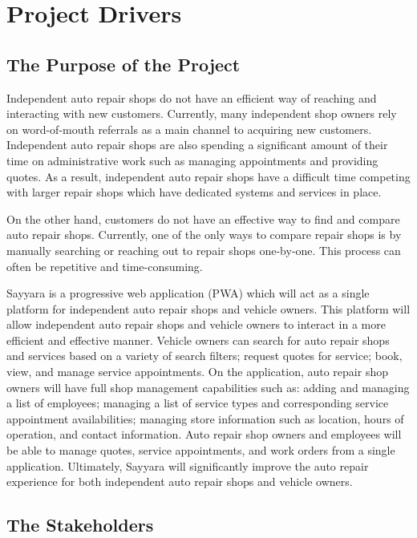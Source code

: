\documentclass[12pt]{article}
\begin{document}
\section{Project Drivers}

\subsection{The Purpose of the Project}

Independent auto repair shops do not have an efficient way of reaching and interacting with new
customers. Currently, many independent shop owners rely on word-of-mouth referrals as a main
channel to acquiring new customers. Independent auto repair shops are also spending a significant
amount of their time on administrative work such as managing appointments and providing quotes. As
a result, independent auto repair shops have a difficult time competing with larger repair shops
which have dedicated systems and services in place.

On the other hand, customers do not have an effective way to find and compare auto repair shops.
Currently, one of the only ways to compare repair shops is by manually searching or reaching out to
repair shops one-by-one. This process can often be repetitive and time-consuming.

Sayyara is a progressive web application (PWA) which will act as a single platform for independent
auto repair shops and vehicle owners. This platform will allow independent auto repair shops and
vehicle owners to interact in a more efficient and effective manner. Vehicle owners can search for
auto repair shops and services based on a variety of search filters; request quotes for service;
book, view, and manage service appointments. On the application, auto repair shop owners will have
full shop management capabilities such as: adding and managing a list of employees; managing a list
of service types and corresponding service appointment availabilities; managing store information
such as location, hours of operation, and contact information. Auto repair shop owners and
employees will be able to manage quotes, service appointments, and work orders from a single
application. Ultimately, Sayyara will significantly improve the auto repair experience for both
independent auto repair shops and vehicle owners.

\subsection{The Stakeholders}
\end{document}
